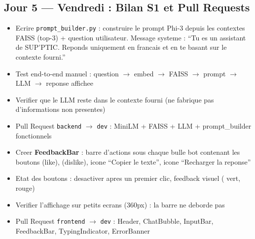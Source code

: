 \documentclass[11pt,a4paper]{article}
\begin{document}
\subsection{Jour 5 --- Vendredi : Bilan S1 et Pull Requests}

\begin{ragbox}[Backend --- J5]
\begin{itemize}
    \item[$\square$] Ecrire \texttt{prompt\_builder.py} : construire le prompt Phi-3 depuis les contextes FAISS (top-3) + question utilisateur. Message systeme : ``Tu es un assistant de SUP'PTIC. Reponds uniquement en francais et en te basant sur le contexte fourni.''
    \item[$\square$] Test end-to-end manuel : question $\rightarrow$ embed $\rightarrow$ FAISS $\rightarrow$ prompt $\rightarrow$ LLM $\rightarrow$ reponse affichee
    \item[$\square$] Verifier que le LLM reste dans le contexte fourni (ne fabrique pas d'informations non presentes)
    \item[$\square$] Pull Request \texttt{backend} $\rightarrow$ \texttt{dev} : MiniLM + FAISS + LLM + prompt\_builder fonctionnels
\end{itemize}
\end{ragbox}

\begin{reactbox}[Frontend --- J5]
\begin{itemize}
    \item[$\square$] Creer \textbf{FeedbackBar} : barre d'actions sous chaque bulle bot contenant les boutons  (like),  (dislike), icone ``Copier le texte'', icone ``Recharger la reponse''
    \item[$\square$] Etat des boutons : desactiver apres un premier clic, feedback visuel ( vert,  rouge)
    \item[$\square$] Verifier l'affichage sur petits ecrans (360px) : la barre ne deborde pas
    \item[$\square$] Pull Request \texttt{frontend} $\rightarrow$ \texttt{dev} : Header, ChatBubble, InputBar, FeedbackBar, TypingIndicator, ErrorBanner
\end{itemize}
\end{reactbox}
\end{document}
